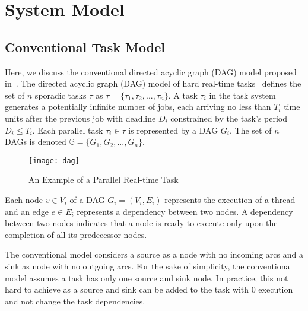 \section{System Model}

\subsection{Conventional Task Model}
Here, we discuss the conventional directed acyclic graph (DAG) model proposed in~\cite{li2014analysis}.
The directed acyclic graph (DAG) model of hard real-time
tasks~\cite{li2014analysis} defines the set of ${n}$ sporadic tasks ${\tau}$ as
${\tau = \{\tau_1,\tau_2, ..., \tau_n\}}$. A task ${\tau_i}$
in the task system generates a potentially infinite number of jobs,
each arriving no less than ${T_i}$ time units after the previous
job with deadline ${D_i}$ constrained by the task's period
${D_i \leq T_i}$. Each parallel task ${\tau_i \in \tau}$
is represented by a DAG ${G_i}$. The set of ${n}$ DAGs is
denoted ${\mathbb{G} = \{G_1, G_2, ..., G_n\}}$.

\begin{figure}[!h]
  \centering
  \texttt{[image: dag]}
  \caption{An Example of a Parallel Real-time Task}
  \label{fig:dag}
\end{figure}
  


Each node ${v \in V_i}$ of a DAG ${G_i =
  (V_i, E_i)}$ represents the 
execution of a thread and an edge ${e \in E_i}$ represents a
dependency between two nodes. A dependency between two nodes indicates
that a node is ready to execute only upon the completion of all its
predecessor nodes. 


The conventional model considers a source as a node with no incoming
arcs and a sink as node with no outgoing arcs. For the sake of
simplicity, the conventional model assumes a task has only one source and sink node. In
practice, this not hard to achieve as a source and sink can be added
to the task with $0$ execution and not change the task dependencies.

